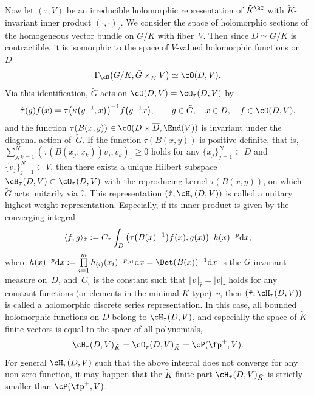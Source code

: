 Now let $(\tau,V)$ be an irreducible holomorphic representation of $\tilde{K}^\BC$ with $\tilde{K}$-invariant inner product $(\cdot,\cdot)_\tau$.
We consider the space of holomorphic sections of the homogeneous vector bundle on $G/K$ with fiber~$V$. Then since $D\simeq G/K$ is contractible, it is isomorphic to the space of $V$-valued holomorphic functions on~$D$
\begin{gather*} \Gamma_\cO\big(G/K, \tilde{G}\times_{\tilde{K}}V\big)\simeq \cO(D,V). \end{gather*}
Via this identification, $\tilde{G}$ acts on $\cO(D,V)=\cO_\tau(D,V)$ by
\begin{gather*} \hat{\tau}(g)f(x)=\tau\big(\kappa\big(g^{-1},x\big)\big)^{-1}f\big(g^{-1}x\big),\qquad g\in\tilde{G}, \quad x\in D, \quad f\in\cO(D,V) , \end{gather*}
and the function $\tau(B(x,y))\in \cO(D\times\overline{D},\End(V))$ is invariant under the diagonal action of~$\tilde{G}$.
If the function $\tau(B(x,y))$ is positive-definite, that is,
$\sum\limits_{j,k=1}^N(\tau(B(x_j,x_k))v_j,v_k)_\tau\ge 0$ holds for any $\{x_j\}_{j=1}^N\subset D$ and $\{v_j\}_{j=1}^N\subset V$,
then there exists a unique Hilbert subspace $\cH_\tau(D,V)\subset\cO_\tau(D,V)$ with the reproducing kernel $\tau(B(x,y))$,
on which $\tilde{G}$ acts unitarily via $\hat{\tau}$.
This representation $(\hat{\tau},\cH_\tau(D,V))$ is called a unitary highest weight representation.
Especially, if its inner product is given by the converging integral
\begin{gather*} \langle f,g\rangle_{\hat{\tau}}:=C_\tau\int_D \big(\tau\big(B(x)^{-1}\big)f(x),g(x)\big)_{\tau}h(x)^{-p}{\rm d}x, \end{gather*}
where $h(x)^{-p}{\rm d}x:=\prod\limits_{i=1}^m h_{(i)}(x_i)^{-p_{(i)}}{\rm d}x=\Det(B(x))^{-1}{\rm d}x$ is the $G$-invariant measure on~$D$,
and~$C_\tau$ is the constant such that $\Vert v\Vert_{\hat{\tau}}=|v|_\tau$ holds for any constant functions
(or elements in the minimal $K$-type)~$v$,
then $(\hat{\tau},\cH_\tau(D,V))$ is called a holomorphic discrete series representation.
In this case, all bounded holomorphic functions on $D$ belong to $\cH_\tau(D,V)$,
and especially the space of $\tilde{K}$-finite vectors is equal to the space of all polynomials,
\begin{gather*} \cH_\tau(D,V)_{\tilde{K}}=\cO_\tau(D,V)_{\tilde{K}}=\cP(\fp^+,V). \end{gather*}
For general $\cH_\tau(D,V)$ such that the above integral does not converge for any non-zero function,
it may happen that the $\tilde{K}$-finite part $\cH_\tau(D,V)_{\tilde{K}}$ is strictly smaller than $\cP(\fp^+,V)$.

